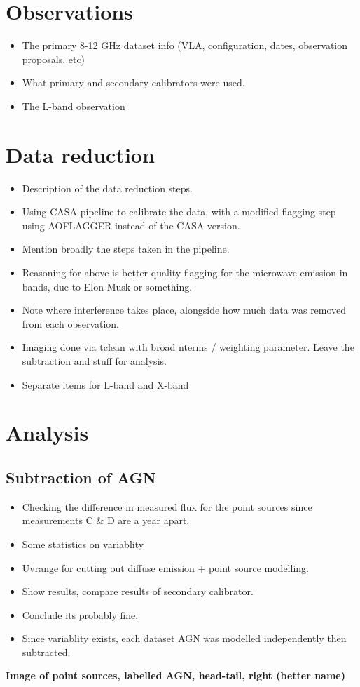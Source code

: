 \documentclass{pas}
\begin{document}
\section{Observations}

\begin{itemize}
  \item The primary 8-12 GHz dataset info (VLA, configuration, dates, observation proposals, etc)
  \item What primary and secondary calibrators were used.
  \item The L-band observation
\end{itemize}

\section{Data reduction}

\begin{itemize}
  \item Description of the data reduction steps.
  \item Using CASA pipeline to calibrate the data, with a modified flagging step using AOFLAGGER instead of the CASA version.
  \item Mention broadly the steps taken in the pipeline.
  \item Reasoning for above is better quality flagging for the microwave emission in bands, due to Elon Musk or something.
  \item Note where interference takes place, alongside how much data was removed from each observation. 
  \item Imaging done via tclean with broad nterms / weighting parameter. Leave the subtraction and stuff for analysis. 
  \item Separate items for L-band and X-band
\end{itemize}

\section{Analysis}

\subsection{Subtraction of AGN}
\begin{itemize}
  \item Checking the difference in measured flux for the point sources since measurements C \& D are a year apart.
  \item Some statistics on variablity
  \item Uvrange for cutting out diffuse emission + point source modelling.
  \item Show results, compare results of secondary calibrator. 
  \item Conclude its probably fine.
  \item Since variablity exists, each dataset AGN was modelled independently then subtracted.
\end{itemize}
\textbf{Image of point sources, labelled AGN, head-tail, right (better name)}
\end{document}
